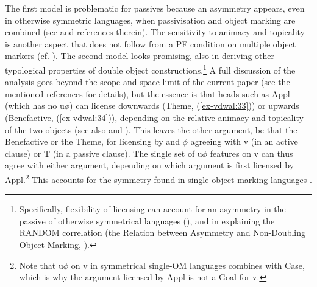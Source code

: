 \documentclass[output=paper
,modfonts
,nonflat]{langsci/langscibook}
\begin{document}
The first model is problematic for passives because an asymmetry appears, even in otherwise symmetric languages, when passivisation and object marking are combined (see \citealt{Holmberg_Et_AlTA} and references therein). The sensitivity to animacy and topicality is another aspect that does not follow from a PF condition on multiple object markers (cf. \citealt{Zeller2012}). The second model looks promising, also in deriving other typological properties of double object constructions.\footnote{Specifically, flexibility of licensing can account for an asymmetry in the passive of otherwise symmetrical languages (\citealt{Holmberg_Et_AlTA}), and in explaining the RANDOM correlation (the Relation between Asymmetry and Non-Doubling Object Marking, \citealt{Van_der_Wal2017b}).} A full discussion of the analysis goes beyond the scope and space-limit of the current paper (see the mentioned references for details), but the essence is that heads such as Appl (which has no u$\phi$) can license downwards (Theme, (\ref{ex-vdwal:33})) or upwards (Benefactive, (\ref{ex-vdwal:34})), depending on the relative animacy and topicality of the two objects (see also  and ). This leaves the other argument, be that the Benefactive or the Theme, for licensing by and $\phi$ agreeing with v (in an active clause) or T (in a passive clause). The single set of u$\phi$ features on v can thus agree with either argument, depending on which argument is first licensed by Appl.\footnote{Note that u$\phi$ on v in symmetrical single-OM languages combines with Case, which is why the argument licensed by Appl is not a Goal for v.} This accounts for the symmetry found in single object marking languages \citep{Van_der_Wal2017a}.
\end{document}
